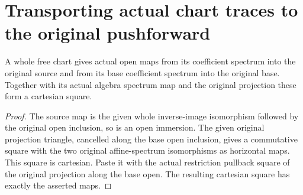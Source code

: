 \section{Transporting actual chart traces to the original pushforward}

\begin{lemma}
\label{lem:kn-structure-trace-chart-cartesian}
\leanok
A whole free chart gives actual open maps from its coefficient spectrum
into the original source and from its base coefficient spectrum into the
original base. Together with its actual algebra spectrum map and the
original projection these form a cartesian square.
\end{lemma}
\begin{proof}
The source map is the given whole inverse-image isomorphism followed by
the original open inclusion, so is an open immersion. The given original
projection triangle, cancelled along the base open inclusion, gives a
commutative square with the two original affine-spectrum isomorphisms as
horizontal maps. This square is cartesian. Paste it with the actual
restriction pullback square of the original projection along the base
open. The resulting cartesian square has exactly the asserted maps.
\end{proof}

